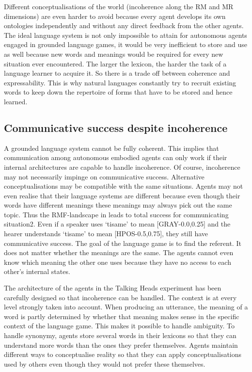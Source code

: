 Different conceptualisations of the world (incoherence 
along the RM and MR dimensions) are even harder to 
avoid because every agent develops its own 
ontologies independently and without any direct 
feedback from the other agents. 
The ideal language system is not only impossible to 
attain for autonomous agents engaged in grounded
language games, it would be very 
inefficient to store and use as well because 
new words and meanings would be required for every new 
situation ever encountered. The larger the lexicon,
the harder the task of a language learner to acquire it. 
So there is a trade off between coherence and expressability. 
This is why natural languages constantly try to recruit existing 
words to keep down the repertoire of 
forms that have to be stored and hence learned.

\subsection{Communicative success despite incoherence}

A grounded language system cannot be fully coherent. 
This implies that communication among autonomous 
embodied agents can only work if their internal 
architectures are capable to handle incoherence. 
Of course, incoherence may not necessarily 
impinge on communicative success. 
Alternative conceptualisations may 
be compatible with the same situations. Agents may not
even realise that their language systems are different
because even though their words have different 
meanings these meanings may always pick out the 
same topic. Thus 
the RMF-landscape in  leads to total
success for communicating situation2. Even if 
a speaker uses `tisame' to mean [GRAY-0.0,0.25] and the hearer
understands `tisame' to mean [HPOS-0.5,0.75], they 
still have communicative success. The goal 
of the language game is to find the referent. It does
not matter whether the meanings are the same. The agents
cannot even know which meaning the other one uses
because they have no access to each other's internal states. 

The architecture of the agents in the Talking Heads
experiment has been carefully designed so that incoherence
can be handled. The context
is at every level strongly taken into account. When 
producing an utterance, the meaning of a word is partly
determined by whether
that meaning makes sense in the specific context
of the language game. This makes it possible to 
handle ambiguity. To handle synonymy, agents store several words in 
their lexicons so that they can understand more words
than the ones they prefer themselves. Agents maintain 
different ways to conceptualise reality so that 
they can apply conceptualisations used by others
even though they would not prefer these themselves. 

